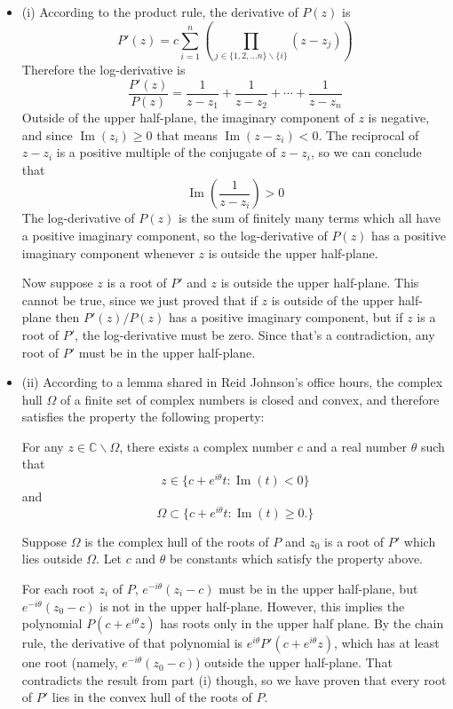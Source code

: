 \documentclass[12pt]{article}
\begin{document}
\begin{itemize}
    \item (i) According to the product rule, the derivative of $P(z)$ is
        \[ P'(z) = c \sum_{i=1}^n \left( \prod_{j \in \{1,2,\dots n\} \backslash \{ i \}} (z - z_j) \right) \]
        Therefore the log-derivative is
        \[ \frac{P'(z)}{P(z)} = \frac{1}{z-z_1} + \frac{1}{z-z_2} + \cdots + \frac{1}{z-z_n} \]
        Outside of the upper half-plane, the imaginary component of $z$ is negative, and since $\operatorname{Im}(z_i) \geq 0$ that means $\operatorname{Im}(z-z_i) < 0$. The reciprocal of $z-z_i$ is a positive multiple of the conjugate of $z-z_i$, so we can conclude that
        \[ \operatorname{Im} \left( \frac{1}{z-z_i} \right) > 0 \]
        The log-derivative of $P(z)$ is the sum of finitely many terms which all have a positive imaginary component, so the log-derivative of $P(z)$ has a positive imaginary component whenever $z$ is outside the upper half-plane.
        \par
        Now suppose $z$ is a root of $P'$ and $z$ is outside the upper half-plane. This cannot be true, since we just proved that if $z$ is outside of the upper half-plane then $P'(z)/P(z)$ has a positive imaginary component, but if $z$ is a root of $P'$, the log-derivative must be zero. Since that's a contradiction, any root of $P'$ must be in the upper half-plane.
    \item (ii) According to a lemma shared in Reid Johnson's office hours, the complex hull $\Omega$ of a finite set of complex numbers is closed and convex, and therefore satisfies the property the following property:
        \par
        For any $z \in \mathbb{C} \backslash \Omega$, there exists a complex number $c$ and a real number $\theta$ such that
            \[ z \in \{ c+e^{i\theta}t : \operatorname{Im}(t) < 0 \} \]
            and
            \[ \Omega \subset \{ c+e^{i\theta}t : \operatorname{Im}(t) \geq 0. \} \]
        \par
        Suppose $\Omega$ is the complex hull of the roots of $P$ and $z_0$ is a root of $P'$ which lies outside $\Omega$. Let $c$ and $\theta$ be constants which satisfy the property above.
        \par
        For each root $z_i$ of $P$, $e^{-i\theta}(z_i - c)$ must be in the upper half-plane, but $e^{-i\theta}(z_0 - c)$ is not in the upper half-plane. However, this implies the polynomial $P(c + e^{i\theta}z)$ has roots only in the upper half plane. By the chain rule, the derivative of that polynomial is $e^{i\theta}P'(c+e^{i\theta}z)$, which has at least one root (namely, $e^{-i\theta}(z_0 - c)$) outside the upper half-plane. That contradicts the result from part (i) though, so we have proven that every root of $P'$ lies in the convex hull of the roots of $P$.
\end{itemize}
\end{document}
